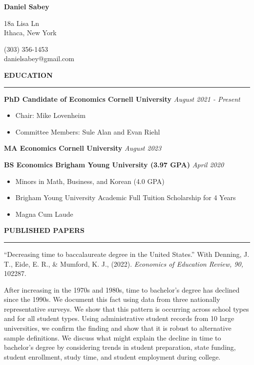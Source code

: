 \documentclass[11pt]{article}
\newcommand{\name}[1]{\begin{center}\Huge\textbf{#1}\end{center}\vspace{-0.5em}}
\newcommand{\address}[1]{\begin{center}#1\end{center}\vspace{-1em}}
\newenvironment{rSection}[1]{
  \vspace{1.5em}
  \noindent\textbf{\MakeUppercase{#1}}
  \vspace{0.2em}\hrule\vspace{0.5em}
}{}
\renewenvironment{quote}{%
  \list{}{\rightmargin=0pt \leftmargin=1.5em}%
  \item\relax
}
{\endlist}
\newenvironment{eduDetails}{%
  \begin{itemize}[label={}, leftmargin=1.5em, itemsep=0.2em, parsep=0pt, topsep=0.2em]
}{%
  \end{itemize}
}
\begin{document}
\name{Daniel Sabey}

\address{18a Lisa Ln \\ Ithaca, New York}
\address{(303) 356-1453 \\ danielsabey@gmail.com}


\begin{rSection}{Education}
    \textbf{PhD Candidate of Economics Cornell University} \hfill \textit{August 2021 - Present}
    \begin{eduDetails}
        \item Chair: Mike Lovenheim
        \item Committee Members: Sule Alan and Evan Riehl
    \end{eduDetails}

    \textbf{MA Economics Cornell University} \hfill \textit{August 2023}
    \vspace{0.5em}
    
    \textbf{BS Economics Brigham Young University (3.97 GPA)} \hfill \textit{April 2020}
    \begin{eduDetails}
        \item Minors in Math, Business, and Korean (4.0 GPA)
        \item Brigham Young University Academic Full Tuition Scholarship for 4 Years
        \item Magna Cum Laude
    \end{eduDetails}
\end{rSection}


\begin{rSection}{Published Papers}
    ``Decreasing time to baccalaureate degree in the United States.'' With Denning, J. T., Eide, E. R., \& Mumford, K. J., (2022). \textit{Economics of Education Review, 90,} 102287.
    \begin{quote}
        \small{After increasing in the 1970s and 1980s, time to bachelor's degree has declined since the 1990s. We document this fact using data from three nationally representative surveys. We show that this pattern is occurring across school types and for all student types. Using administrative student records from 10 large universities, we confirm the finding and show that it is robust to alternative sample definitions. We discuss what might explain the decline in time to bachelor's degree by considering trends in student preparation, state funding, student enrollment, study time, and student employment during college.}
    \end{quote}
\end{rSection}
\end{document}

